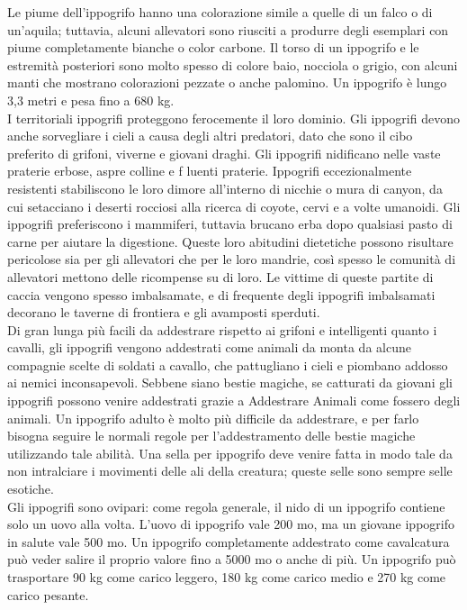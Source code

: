\begin{multicols}{2}
Le piume dell’ippogrifo hanno una colorazione simile a quelle di un falco o di un’aquila; tuttavia, alcuni allevatori sono riusciti a produrre degli esemplari con piume completamente bianche o color carbone. Il torso di un ippogrifo e le estremità posteriori sono molto spesso di colore baio, nocciola o grigio, con alcuni manti che mostrano colorazioni pezzate o anche palomino. Un ippogrifo è lungo 3,3 metri e pesa fino a 680 kg.\\

I territoriali ippogrifi proteggono ferocemente il loro dominio. Gli ippogrifi devono anche sorvegliare i cieli a causa degli altri predatori, dato che sono il cibo preferito di grifoni, viverne e giovani draghi. Gli ippogrifi nidificano nelle vaste praterie erbose, aspre colline e f luenti praterie. Ippogrifi eccezionalmente resistenti stabiliscono le loro dimore all’interno di nicchie o mura di canyon, da cui setacciano i deserti rocciosi alla ricerca di coyote, cervi e a volte umanoidi. Gli ippogrifi preferiscono i mammiferi, tuttavia brucano erba dopo qualsiasi pasto di carne per aiutare la digestione. Queste loro abitudini dietetiche possono risultare pericolose sia per gli allevatori che per le loro mandrie, così spesso le comunità di allevatori mettono delle ricompense su di loro. Le vittime di queste partite di caccia vengono spesso imbalsamate, e di frequente degli ippogrifi imbalsamati decorano le taverne di frontiera e gli avamposti sperduti.\\

Di gran lunga più facili da addestrare rispetto ai grifoni e intelligenti quanto i cavalli, gli ippogrifi vengono addestrati come animali da monta da alcune compagnie scelte di soldati a cavallo, che pattugliano i cieli e piombano addosso ai nemici inconsapevoli. Sebbene siano bestie magiche, se catturati da giovani gli ippogrifi possono venire addestrati grazie a Addestrare Animali come fossero degli animali. Un ippogrifo adulto è molto più difficile da addestrare, e per farlo bisogna seguire le normali regole per l’addestramento delle bestie magiche utilizzando tale abilità. Una sella per ippogrifo deve venire fatta in modo tale da non intralciare i movimenti delle ali della creatura; queste selle sono sempre selle esotiche.\\

Gli ippogrifi sono ovipari: come regola generale, il nido di un ippogrifo contiene solo un uovo alla volta. L’uovo di ippogrifo vale 200 mo, ma un giovane ippogrifo in salute vale 500 mo. Un ippogrifo completamente addestrato come cavalcatura può veder salire il proprio valore fino a 5000 mo o anche di più. Un ippogrifo può trasportare 90 kg come carico leggero, 180 kg come carico medio e 270 kg come carico pesante.\\


\end{multicols}
